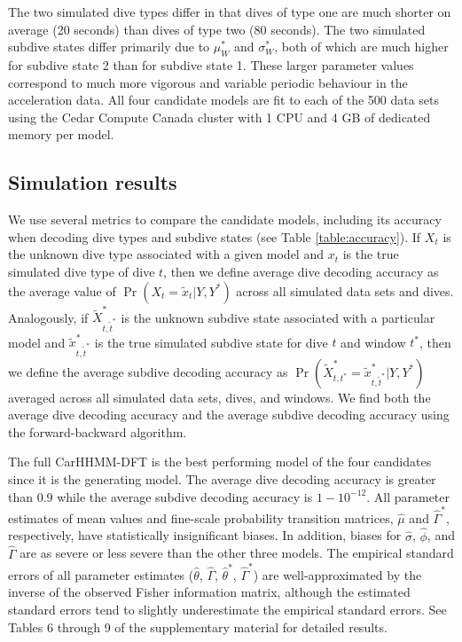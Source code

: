 The two simulated dive types differ in that dives of type one are much shorter on average (20 seconds) than dives of type two (80 seconds). The two simulated subdive states differ primarily due to $\mu_W^*$ and $\sigma_W^*$, both of which are much higher for subdive state 2 than for subdive state 1. These larger parameter values correspond to much more vigorous and variable periodic behaviour in the acceleration data. All four candidate models are fit to each of the 500 data sets using the Cedar Compute Canada cluster with 1 CPU and 4 GB of dedicated memory per model.

\subsection{Simulation results}

We use several metrics to compare the candidate models, including its accuracy when decoding dive types and subdive states (see Table \ref{table:accuracy}). If $X_t$ is the unknown dive type associated with a given model and $x_t$ is the true simulated dive type of dive $t$, then we define average dive decoding accuracy as the average value of $\Pr(X_{t} = \tilde x_{t}|Y,Y^*)$ across all simulated data sets and dives. Analogously, if $\tilde X^*_{t,\tilde t^*}$ is the unknown subdive state associated with a particular model and $\tilde x^*_{t,\tilde t^*}$ is the true simulated subdive state for dive $t$ and window $t^*$, then we define the average subdive decoding accuracy as $\Pr(\tilde X^*_{t,t^*} = \tilde x^*_{t,\tilde t^*}|Y,Y^*)$ averaged across all simulated data sets, dives, and windows. We find both the average dive decoding accuracy and the average subdive decoding accuracy using the forward-backward algorithm.

The full CarHHMM-DFT is the best performing model of the four candidates since it is the generating model. The average dive decoding accuracy is greater than 0.9 while the average subdive decoding accuracy is $1-10^{-12}$. All parameter estimates of mean values and fine-scale probability transition matrices, $\hat \mu$ and $\hat \Gamma^*$, respectively, have statistically insignificant biases. In addition, biases for $\hat \sigma$, $\hat \phi$, and $\hat \Gamma$ are as severe or less severe than the other three models. The empirical standard errors of all parameter estimates ($\hat \theta$, $\hat \Gamma$, $\hat \theta^*$, $\hat \Gamma^*$) are well-approximated by the inverse of the observed Fisher information matrix, although the estimated standard errors tend to slightly underestimate the empirical standard errors. See Tables 6 through 9 of the supplementary material for detailed results.


